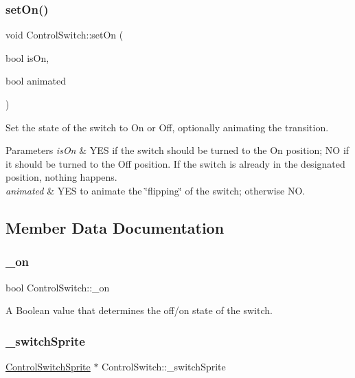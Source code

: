 \subsubsection{\texorpdfstring{set\+On()}{setOn()}\hspace{0.1cm}{\footnotesize\ttfamily [2/2]}}
{\footnotesize\ttfamily void Control\+Switch\+::set\+On (\begin{DoxyParamCaption}\item[{bool}]{is\+On,  }\item[{bool}]{animated }\end{DoxyParamCaption})}

Set the state of the switch to On or Off, optionally animating the transition.


\begin{DoxyParams}{Parameters}
{\em is\+On} & Y\+ES if the switch should be turned to the On position; NO if it should be turned to the Off position. If the switch is already in the designated position, nothing happens. \\
\hline
{\em animated} & Y\+ES to animate the \char`\"{}flipping\char`\"{} of the switch; otherwise NO. \\
\hline
\end{DoxyParams}


\subsection{Member Data Documentation}
\mbox{\label{classControlSwitch_a0f06a0c1dfaceba223dcaa2933a3d51e}} 
\subsubsection{\texorpdfstring{\+\_\+on}{\_on}}
{\footnotesize\ttfamily bool Control\+Switch\+::\+\_\+on\hspace{0.3cm}{\ttfamily [protected]}}

A Boolean value that determines the off/on state of the switch. \mbox{\label{classControlSwitch_a178f3ecaa1335d3521560ae6d24e8ff7}} 
\subsubsection{\texorpdfstring{\+\_\+switch\+Sprite}{\_switchSprite}}
{\footnotesize\ttfamily \hyperlink{classControlSwitchSprite}{Control\+Switch\+Sprite} $\ast$ Control\+Switch\+::\+\_\+switch\+Sprite\hspace{0.3cm}{\ttfamily [protected]}}

